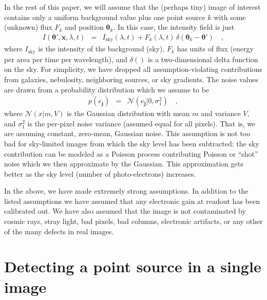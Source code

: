 \documentclass[letterpaper,preprint]{aastex}
\newcommand{\doctype}{paper}
\newcommand{\gaussianN}{\mathcal{N}}
\newcommand{\gaussian}[1]{\gaussianN\!\left(#1\right)}
\newcommand{\sky}{\mathrm{sky}}
\newcommand{\noise}{e}
\renewcommand{\vec}[1]{\boldsymbol{#1}}
\newcommand{\thetavec}{\vec{\theta}}
\newcommand{\jvec}{\vec{j}}
\newcommand{\posvec}{\vec{x}}
\begin{document}
In %
the rest of this \doctype, we will assume that the (perhaps tiny) image of
interest contains only a uniform background value plus one point
source $k$ with some (unknown) flux $F_k$ and position $\thetavec_k$.
In this case, the intensity field is just
\begin{eqnarray}\displaystyle
I(\thetavec',\posvec,\lambda,t) &=& I_{\sky}(\lambda, t) + F_k(\lambda, t)\,\delta(\thetavec_k - \thetavec')
\quad,
\label{eqn:intensity}
\end{eqnarray}
where $I_{\sky}$ is the intensity of the background (sky), $F_k$ has
units of flux (energy per area per time per wavelength), and
$\delta()$ is a two-dimensional delta function on the sky.  For
simplicity, we have dropped all assumption-violating contributions
from galaxies, nebulosity, neighboring sources, or sky gradients.  The
noise values are drawn from a probability distribution which we assume
to be
\begin{eqnarray}\displaystyle
p(\noise_{\jvec}) &=& \gaussian{\noise_{\jvec}|0,\sigma_1^2}
\quad,
\end{eqnarray}
where $\gaussian{x|m,V}$ is the Gaussian distribution with mean $m$
and variance $V$, and $\sigma_1^2$ is the per-pixel noise variance
(assumed equal for all pixels).  That is, we are assuming constant,
zero-mean, Gaussian noise.  This assumption is not too bad for
sky-limited images from which the sky level has been subtracted: the
sky contribution can be modeled as a Poisson process contributing
Poisson or ``shot'' noise which we then approximate by the Gaussian.
This approximation gets better as the sky level (number of
photo-electrons) increases.

In the above, we have made extremely strong assumptions.  In addition
to the listed assumptions we have assumed that any electronic gain at
readout has been calibrated out.  We have also assumed that the image
is not contaminated by cosmic rays, stray light, bad pixels, bad
columns, electronic artifacts, or any other of the many defects in
real images.

\section{Detecting a point source in a single image}
\end{document}
